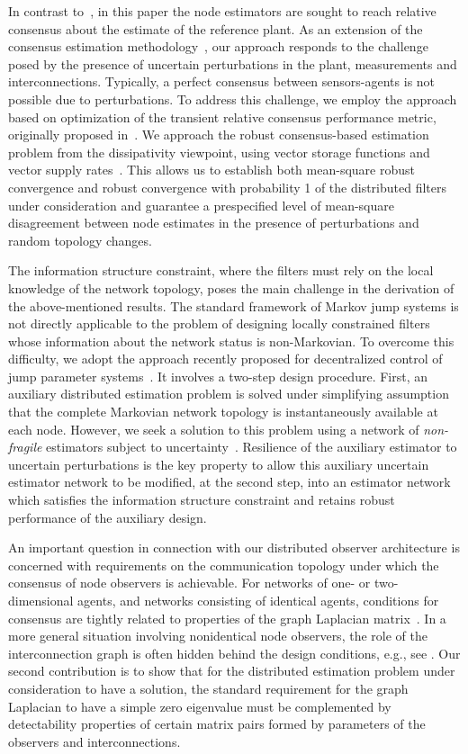 \documentclass[a4paper,twocolumn]{autart}
\begin{document}
In contrast to~\cite{SS-2009,SWH-2010}, in this paper the node
estimators are sought to reach relative 
consensus about the estimate of the reference plant. As an extension of the
consensus estimation methodology~\cite{Olfati-Saber-2007}, our approach
responds to the challenge posed by the presence of uncertain perturbations in
the plant, measurements and interconnections. Typically, a perfect consensus
between sensors-agents is not possible due to perturbations. 
To address this challenge, we employ
the approach based on optimization of the transient relative 
consensus performance metric, originally proposed 
in~\cite{U6}. We approach the robust
consensus-based estimation problem from the dissipativity viewpoint, 
using vector storage functions and vector supply rates~\cite{HCN-2004}. 
This allows us to establish both mean-square robust convergence and robust
convergence with probability 1 of the distributed filters under
consideration and guarantee a prespecified level of 
mean-square disagreement between node estimates in the presence of
perturbations and random topology changes.  

The information structure constraint, where the filters must rely on the local
knowledge of the network topology, poses the main challenge in
the derivation of the above-mentioned results. The
standard framework of Markov jump systems is not directly applicable
to the problem of designing locally constrained filters whose information
about the network status is non-Markovian. 
To overcome this difficulty, we adopt the approach recently proposed for 
decentralized control of jump parameter systems~\cite{XiUP1}. It involves a
two-step design procedure. First, an auxiliary distributed estimation
problem is solved under 
simplifying assumption that the complete Markovian network topology is
instantaneously available at each node. However, we seek a solution to
this problem using a network of \emph{non-fragile} estimators subject to
uncertainty~\cite{HC-2000}. Resilience of the auxiliary estimator to
uncertain perturbations is the key 
property to allow this auxiliary 
uncertain estimator network to be modified, at the second step, into an
estimator network which satisfies the information structure constraint and
retains robust performance of the auxiliary design.  



An important question in connection with our
distributed observer architecture is concerned
with  requirements on the communication topology under which the 
consensus of node observers is achievable. 
For networks of one- or two-dimensional agents, and
networks consisting of identical agents, conditions for consensus are tightly
related to properties of the graph Laplacian
matrix~\cite{OM-2004,RB-2005,ZLD-2011}. In a more general situation 
involving nonidentical node observers, the role of the interconnection graph
is often hidden behind the design conditions,
e.g., see \cite{SS-2009,SWH-2010}. Our second contribution is to show that
for the distributed 
estimation problem under consideration to have a solution, the standard
requirement for the graph Laplacian to have a simple zero eigenvalue must be
complemented by detectability properties of certain matrix pairs formed by
parameters of the observers and interconnections.  
\end{document}

